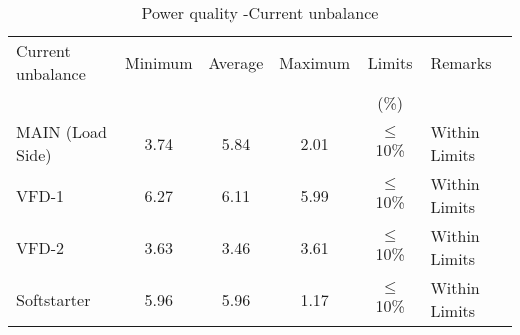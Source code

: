 \begin{table}[!htb]
	\caption{Power quality -Current unbalance}
	\label{tbl_ch04_elecaudit_powerquality_currentunbalance}
	{\scriptsize	
	\begin{tabular}{l|c|c|c|c|l}
\hline
Current unbalance & Minimum & Average & Maximum & Limits & Remarks \\ 
&  &  &  & (\%) &  \\ 
\hline
MAIN (Load Side) & 3.74 & 5.84 & 2.01 & $\leq$ 10\% & Within Limits \\ 
VFD-1 & 6.27 & 6.11 & 5.99 & $\leq$ 10\% & Within Limits \\ 
VFD-2 & 3.63 & 3.46 & 3.61 & $\leq$ 10\% & Within Limits \\ 
Softstarter & 5.96 & 5.96 & 1.17 & $\leq$ 10\% & Within Limits \\ 
\hline
	\end{tabular}
		
	}%
\end{table}
